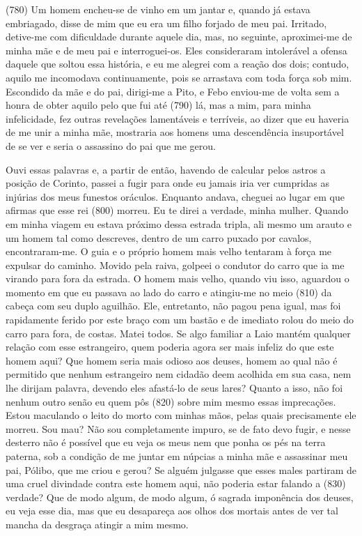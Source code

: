 (780) Um homem encheu-se de vinho em um jantar e, quando já estava
embriagado, disse de mim que eu era um filho forjado de meu pai.
Irritado, detive-me com dificuldade durante aquele dia, mas, no
seguinte, aproximei-me de minha mãe e de meu pai e interroguei-os. Eles
consideraram intolerável a ofensa daquele que soltou essa história, e eu
me alegrei com a reação dos dois; contudo, aquilo me incomodava
continuamente, pois se arrastava com toda força sob mim. Escondido da
mãe e do pai, dirigi-me a Pito, e Febo enviou-me de volta sem a honra de
obter aquilo pelo que fui até (790) lá, mas a mim, para minha
infelicidade, fez outras revelações lamentáveis e terríveis, ao dizer
que eu haveria de me unir a minha mãe, mostraria aos homens uma
descendência insuportável de se ver e seria o assassino do pai que me
gerou.

Ouvi essas palavras e, a partir de então, havendo de calcular pelos
astros a posição de Corinto, passei a fugir para onde eu jamais iria ver
cumpridas as injúrias dos meus funestos oráculos. Enquanto andava,
cheguei ao lugar em que afirmas que esse rei (800) morreu. Eu te direi a
verdade, minha mulher. Quando em minha viagem eu estava próximo dessa
estrada tripla, ali mesmo um arauto e um homem tal como descreves,
dentro de um carro puxado por cavalos, encontraram-me. O guia e o
próprio homem mais velho tentaram à força me expulsar do caminho. Movido
pela raiva, golpeei o condutor do carro que ia me virando para fora da
estrada. O homem mais velho, quando viu isso, aguardou o momento em que
eu passava ao lado do carro e atingiu-me no meio (810) da cabeça com seu
duplo aguilhão. Ele, entretanto, não pagou pena igual, mas foi
rapidamente ferido por este braço com um bastão e de imediato rolou do
meio do carro para fora, de costas. Matei todos. Se algo familiar a Laio
mantém qualquer relação com esse estrangeiro, quem poderia agora ser
mais infeliz do que este homem aqui? Que homem seria mais odioso aos
deuses, homem ao qual não é permitido que nenhum estrangeiro nem cidadão
deem acolhida em sua casa, nem lhe dirijam palavra, devendo eles
afastá-lo de seus lares? Quanto a isso, não foi nenhum outro senão eu
quem pôs (820) sobre mim mesmo essas imprecações. Estou maculando o
leito do morto com minhas mãos, pelas quais precisamente ele morreu. Sou
mau? Não sou completamente impuro, se de fato devo fugir, e nesse
desterro não é possível que eu veja os meus nem que ponha os pés na
terra paterna, sob a condição de me juntar em núpcias a minha mãe e
assassinar meu pai, Pólibo, que me criou e gerou? Se alguém julgasse que
esses males partiram de uma cruel divindade contra este homem aqui, não
poderia estar falando a (830) verdade? Que de modo algum, de modo algum,
ó sagrada imponência dos deuses, eu veja esse dia, mas que eu desapareça
aos olhos dos mortais antes de ver tal mancha da desgraça atingir a mim
mesmo.

